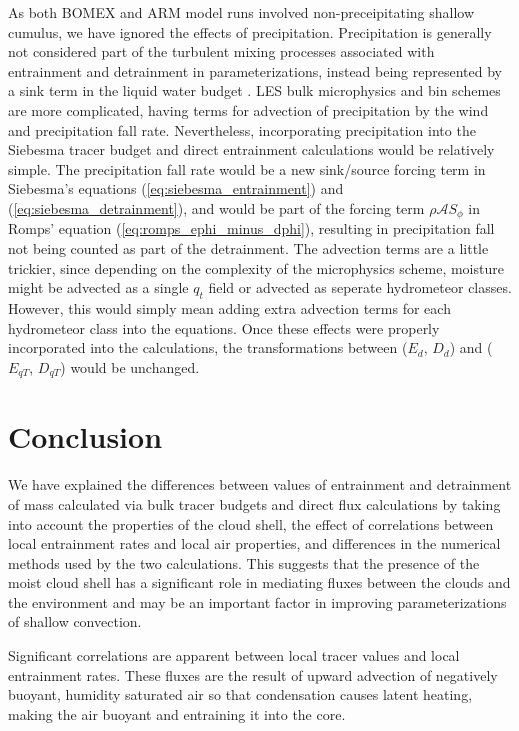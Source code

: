 \documentclass[12pt]{article}
\begin{document}
As both BOMEX and ARM model runs involved non-preceipitating shallow cumulus, 
we have ignored the effects of precipitation.  Precipitation is generally not
considered part of the turbulent mixing processes associated with entrainment 
and detrainment in parameterizations, instead being represented by a sink 
term in the liquid water budget \citep{Tiedtke1989, Kain1990}.  LES bulk microphysics and bin schemes are more complicated, having terms for advection 
of precipitation by the wind and precipitation fall rate.  Nevertheless,
incorporating precipitation into the Siebesma tracer budget and direct 
entrainment calculations would be relatively simple.  The precipitation fall
rate would be a new sink/source forcing term in Siebesma's equations 
(\ref{eq:siebesma_entrainment}) and (\ref{eq:siebesma_detrainment}), and 
would be part of the forcing term $\rho \mathcal{A}S_\phi$ in Romps' 
equation (\ref{eq:romps_ephi_minus_dphi}), resulting in precipitation fall 
not being counted as part of the detrainment.  The advection terms are a 
little trickier, since depending on the complexity of the microphysics 
scheme, moisture might be advected as a single $q_t$ field or advected as 
seperate hydrometeor classes.  However, this would simply mean adding extra 
advection terms for each hydrometeor class into the equations.  Once these 
effects were properly incorporated into the calculations, the transformations 
between ($E_d$, $D_d$) and ($E_{qT}$, $D_{qT}$) would be unchanged.


\section{Conclusion}

We have explained the differences between values of entrainment and detrainment 
of mass calculated via bulk tracer budgets and direct flux calculations by 
taking into account the properties of the cloud shell, the effect of 
correlations between local entrainment rates and local air properties, 
and differences in the numerical methods used by the two calculations.  
This suggests that the presence of the moist cloud shell has a significant 
role in mediating fluxes between the clouds and the environment and may be 
an important factor in improving parameterizations of shallow convection.

Significant correlations are apparent between local tracer values and local
entrainment rates.  These fluxes are the result of upward advection of 
negatively buoyant, humidity saturated air so that condensation causes 
latent heating, making the air buoyant and entraining it into the core.
\end{document}
